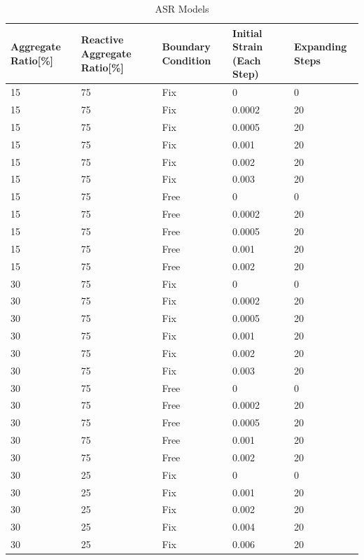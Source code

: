 \begin{table}[ht!]
  \caption{ASR Models}
\centering
\begin{tabular}{ ||p{2cm}|p{2cm}|p{2cm}|p{2cm}|p{2cm}|| }
 \hline
 Aggregate Ratio[\%] &  Reactive Aggregate Ratio[\%] & Boundary Condition & Initial Strain (Each Step) & Expanding Steps \\ [0.5ex]
 \hline\hline
 15 & 75 & Fix & 0 & 0 \\
 15 & 75 & Fix & 0.0002 & 20 \\
 15 & 75 & Fix & 0.0005 & 20 \\
 15 & 75 & Fix & 0.001 & 20 \\
 15 & 75 & Fix & 0.002 & 20 \\
 15 & 75 & Fix & 0.003 & 20 \\

 15 & 75 & Free & 0 & 0 \\
 15 & 75 & Free & 0.0002 & 20 \\
 15 & 75 & Free & 0.0005 & 20 \\
 15 & 75 & Free & 0.001 & 20 \\
 15 & 75 & Free & 0.002 & 20 \\

 30 & 75 & Fix & 0 & 0 \\
 30 & 75 & Fix & 0.0002 & 20 \\
 30 & 75 & Fix & 0.0005 & 20 \\
 30 & 75 & Fix & 0.001 & 20 \\
 30 & 75 & Fix & 0.002 & 20 \\
 30 & 75 & Fix & 0.003 & 20 \\

 30 & 75 & Free & 0 & 0 \\
 30 & 75 & Free & 0.0002 & 20 \\
 30 & 75 & Free & 0.0005 & 20 \\
 30 & 75 & Free & 0.001 & 20 \\
 30 & 75 & Free & 0.002 & 20 \\

 30 & 25 & Fix & 0 & 0 \\
 30 & 25 & Fix & 0.001 & 20 \\
 30 & 25 & Fix & 0.002 & 20 \\
 30 & 25 & Fix & 0.004 & 20 \\
 30 & 25 & Fix & 0.006 & 20 \\  [0.5ex]
 \hline
\end{tabular}

\label{table:ASR_MODELS}
\end{table}

